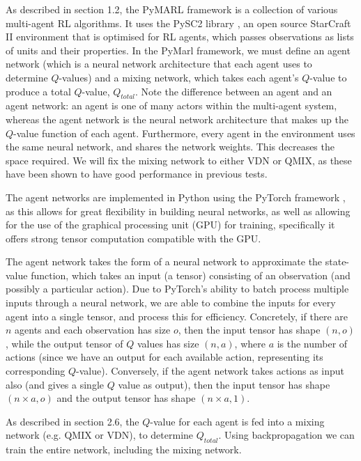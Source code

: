 As described in section 1.2, the PyMARL framework is a collection of various multi-agent RL algorithms. It uses the PySC2 library \cite{pysc2}, an open source StarCraft II environment that is optimised for RL agents, which passes observations as lists of units and their properties. In the PyMarl framework, we must define an agent network (which is a neural network architecture that each agent uses to determine $Q$-values) and a mixing network, which takes each agent's $Q$-value to produce a total $Q$-value, $Q_{total}$. Note the difference between an agent and an agent network: an agent is one of many actors within the multi-agent system, whereas the agent network is the neural network architecture that makes up the $Q$-value function of each agent. Furthermore, every agent in the environment uses the same neural network, and shares the network weights. This decreases the space required. We will fix the mixing network to either VDN or QMIX, as these have been shown to have good performance in previous tests. 

The agent networks are implemented in Python using the PyTorch framework \cite{pytorch}, as this allows for great flexibility in building neural networks, as well as allowing for the use of the graphical processing unit (GPU) for training, specifically it offers strong tensor computation compatible with the GPU.

The agent network takes the form of a neural network to approximate the state-value function, which takes an input (a tensor) consisting of an observation (and possibly a particular action). Due to PyTorch's ability to batch process multiple inputs through a neural network, we are able to combine the inputs for every agent into a single tensor, and process this for efficiency. Concretely, if there are $n$ agents and each observation has size $o$, then the input tensor has shape $(n, o)$, while the output tensor of $Q$ values has size $(n, a)$, where $a$ is the number of actions (since we have an output for each available action, representing its corresponding $Q$-value). Conversely, if the agent network takes actions as input also (and gives a single $Q$ value as output), then the input tensor has shape $(n \times a, o)$ and the output tensor has shape $(n \times a, 1)$.

As described in section 2.6, the $Q$-value for each agent is fed into a mixing network (e.g. QMIX or VDN), to determine $Q_{total}$. Using backpropagation we can train the entire network, including the mixing network.

